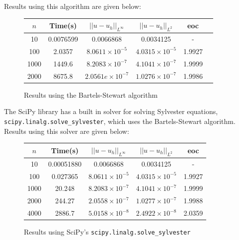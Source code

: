 \documentclass{article}
\numberwithin{equation}{section}
\begin{document}
Results using this algorithm are given below:

\begin{figure}
\begin{table}[H]
\centering
\begin{tabular}{|c|c|c|c|c|c|}
\hline
$n$ & Time(s) & $|| u - u_h ||_{L^{\infty}}$ &$|| u - u_h ||_{L^{2}}$ & eoc \\
\hline
10 & 0.0076599 & 0.0066868 & 0.0034125 & - \\
100 & 2.0357 & $8.0611 \times 10^{-5}$ & $4.0315 \times 10^{-5}$ & 1.9927 \\
1000 & 1449.6 & $8.2083 \times 10^{-7}$ & $4.1041 \times 10^{-7}$ & 1.9999 \\
2000 & 8675.8 & $2.0561e \times 10^{-7}$ & $1.0276 \times 10^{-7}$ & 1.9986 \\
\hline
\end{tabular}
\end{table}
\caption{Results using the Bartels-Stewart algorithm}
\end{figure}

The SciPy library has a built in solver for solving Sylvester equations, \texttt{scipy.linalg.solve\_sylvester}, which uses the Bartels-Stewart algorithm. Results using this solver are given below:

\begin{figure}
\begin{table}[H]
\centering
\begin{tabular}{|c|c|c|c|c|}
\hline
$n$ & Time(s) & $|| u - u_h ||_{L^{\infty}}$ &$|| u - u_h ||_{L^{2}}$ & eoc \\
\hline
10 & 0.00051880 & 0.0066868 & 0.0034125 & -  \\
100 & 0.027365 & $8.0611 \times 10^{-5}$ & $4.0315 \times 10^{-5}$ & 1.9927  \\
1000 & 20.248 & $8.2083 \times 10^{-7}$ & $4.1041 \times 10^{-7}$ & 1.9999 \\
2000 & 244.27 & $2.0558 \times 10^{-7}$ & $1.0277 \times 10^{-7}$ & 1.9988  \\
4000 & 2886.7 & $5.0158 \times 10^{-8}$ & $2.4922 \times 10^{-8}$ & 2.0359 \\
\hline
\end{tabular}
\end{table}
\caption{Results using SciPy's \texttt{scipy.linalg.solve\_sylvester}}
\end{figure}
\end{document}
